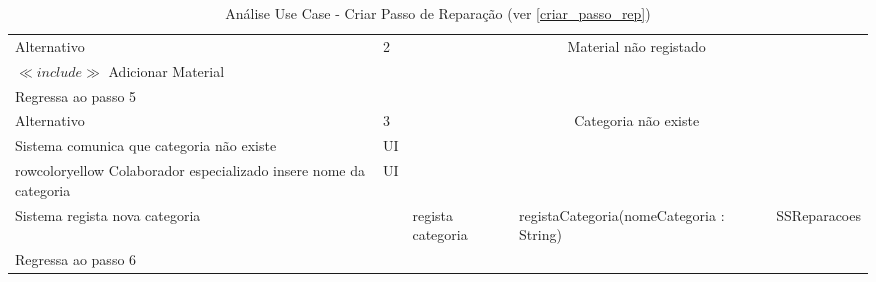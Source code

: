 \documentclass[../relatorio.tex]{subfiles}
\begin{document}
\begin{landscape}
\begin{table}[!h]
\begin{tabular}{|p{5cm}|p{1cm}|p{4cm}|p{6cm}|p{3cm}|}
                     & 
                     & 
                     & 
            \\
            \hline
            \rowcolor{green!30}
            Alternativo  & 2                                                 &  \multicolumn{3}{c}{Material não registado}\\
            \hline
            $\ll include \gg$ Adicionar Material
                     & 
                     & 
                     & 
                     & 
            \\
            \hline
            Regressa ao passo 5
                     & 
                     & 
                     & 
                     & 
            \\
            \hline
            \rowcolor{green!30}
            Alternativo  & 3                                                &  \multicolumn{3}{c}{Categoria não existe}\\
            \hline
            \rowcolor{yellow}
            Sistema comunica que categoria não existe 
                     & UI
                     & 
                     & 
                     & 
            \\
            \hline
            rowcolor{yellow}
            Colaborador especializado insere nome da categoria 
                     & UI
                     & 
                     & 
                     & 
            \\
            \hline
            Sistema regista nova categoria
                     & 
                     & regista categoria 
                     & registaCategoria(nomeCategoria : String)
                     & SSReparacoes
            \\
            \hline
            Regressa ao passo 6
                     & 
                     & 
                     & 
                     & 
            \\
            \hline
        \end{tabular}
        \caption{Análise Use Case - Criar Passo de Reparação (ver \ref{criar_passo_rep})}
    \end{table}
\end{landscape}
\end{document}
